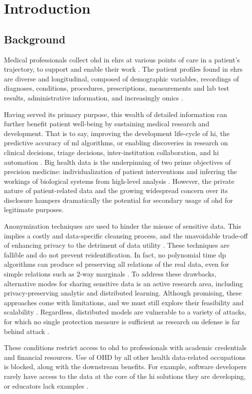 \glsresetall
\section{Introduction}
    \subsection{Background}
        Medical professionals collect \gls{ohd} in \glspl{ehr} at various points of care in a patient’s trajectory, to support and enable their work \cite{Cowie_2016}. The patient profiles found in \glspl{ehr} are diverse and longitudinal, composed of demographic variables, recordings of diagnoses, conditions, procedures, prescriptions, measurements and lab test results, administrative information, and increasingly omics \cite{Ohdsi2020-vf}.\par
        Having served its primary purpose, this wealth of detailed information can further benefit patient well-being by sustaining medical research and development. That is to say, improving the development life-cycle of \gls{hi}, the predictive accuracy of \gls{ml} algorithms, or enabling discoveries in research on clinical decisions, triage decisions, inter-institution collaboration, and \gls{hi} automation \cite{Rudin_2020, Rankin2020}. Big health data is the underpinning of two prime objectives of precision medicine: individualization of patient interventions and inferring the workings of biological systems from high-level analysis \cite{Capobianco2020}. However, the private nature of patient-related data and the growing widespread concern over its disclosure hampers dramatically the potential for secondary usage of \gls{ohd} for legitimate purposes.\par
        Anonymization techniques are used to hinder the misuse of sensitive data. This implies a costly and data-specific cleansing process, and the unavoidable trade-off of enhancing privacy to the detriment of data utility \cite{Dankar2012-bd, Cheu2019-vh, De_Cristofaro2020-tl}. These techniques are fallible and do not prevent reidentification. In fact, no polynomial time \gls{dp} algorithms can produce \gls{sd} preserving all relations of the real data, even for simple relations such as 2-way marginals \cite{Ullman2011}. To address these drawbacks, alternative modes for sharing sensitive data is an active research area, including privacy-preserving analytic and distributed learning. Although promising, these approaches come with limitations, and we must still explore their feasibility and scalability \cite{Raisaro2018-gv}. Regardless, distributed models are vulnerable to a variety of attacks, for which no single protection measure is sufficient as research on defense is far behind attack \cite{enthoven2020overview, Gao2020, Luo2020-gq, Lyu2020-sv}.\par
        These conditions restrict access to \gls{ohd} to professionals with academic credentials and financial resources. Use of OHD by all other health data-related occupations is blocked, along with the downstream benefits. For example, software developers rarely have access to the data at the core of the \gls{hi} solutions they are developing, or educators lack examples \cite{laderas_teaching_2018}.
        
